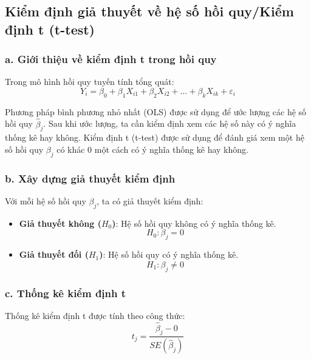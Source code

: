 \subsection{Kiểm định giả thuyết về hệ số hồi quy/Kiểm định t (t-test)}
\subsubsection{a. Giới thiệu về kiểm định t trong hồi quy}

Trong mô hình hồi quy tuyến tính tổng quát:
\begin{equation}
    Y_i = \beta_0 + \beta_1 X_{i1} + \beta_2 X_{i2} + \dots + \beta_k X_{ik} + \varepsilon_i
\end{equation}

Phương pháp bình phương nhỏ nhất (OLS) được sử dụng để ước lượng các hệ số hồi quy $\hat{\beta}_j$. Sau khi ước lượng, ta cần kiểm định xem các hệ số này có ý nghĩa thống kê hay không. Kiểm định t (t-test) được sử dụng để đánh giá xem một hệ số hồi quy $\beta_j$ có khác 0 một cách có ý nghĩa thống kê hay không.

\subsubsection{b. Xây dựng giả thuyết kiểm định}

Với mỗi hệ số hồi quy $\beta_j$, ta có giả thuyết kiểm định:

\begin{itemize}
    \item \textbf{Giả thuyết không ($H_0$)}: Hệ số hồi quy không có ý nghĩa thống kê.
    \begin{equation}
        H_0: \beta_j = 0
    \end{equation}
    \item \textbf{Giả thuyết đối ($H_1$)}: Hệ số hồi quy có ý nghĩa thống kê.
    \begin{equation}
        H_1: \beta_j \neq 0
    \end{equation}
\end{itemize}

\subsubsection{c. Thống kê kiểm định t}

Thống kê kiểm định t được tính theo công thức:
\begin{equation}
    t_j = \frac{\hat{\beta}_j - 0}{SE(\hat{\beta}_j)}
\end{equation}

